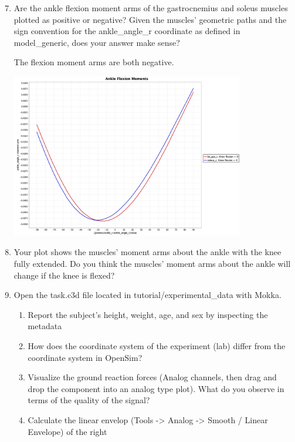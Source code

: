 \documentclass[11pt]{article}
\begin{document}
\begin{enumerate}
    \setcounter{enumi}{6}
    \item Are the ankle flexion moment arms of the gastrocnemius and soleus muscles plotted as positive or negative? Given the muscles’ geometric paths and the sign convention for the ankle\_angle\_r coordinate as defined in model\_generic, does your answer make sense?
    \begin{adjustwidth}{0.5cm}{}
        The flexion moment arms are both negative. 
        \begin{center}
            \includegraphics[width=0.8\textwidth]{screens/soleus_lat_moments.png}
        \end{center}
    \end{adjustwidth}
    \item Your plot shows the muscles’ moment arms about the ankle with the knee fully extended. Do you think the muscles’ moment arms about the ankle will change if the knee is flexed?
    \item Open the task.c3d file located in tutorial/experimental\_data with Mokka.
    \begin{enumerate}
        \item Report the subject's height, weight, age, and sex by inspecting the metadata
        \item How does the coordinate system of the experiment (lab) differ from the coordinate
        system in OpenSim?
        \item Visualize the ground reaction forces (Analog channels, then drag and drop the
        component into an analog type plot). What do you observe in terms of the quality of
        the signal?
        \item Calculate the linear envelop (Tools -> Analog -> Smooth / Linear Envelope) of the right

\end{enumerate}
\end{enumerate}
\end{document}
